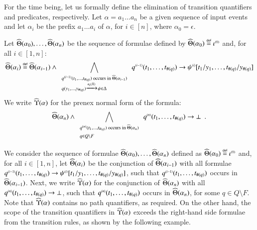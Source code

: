 For the time being, let us formally define the elimination of
transition quantifiers and predicates, respectively. Let $\alpha = a_1
\ldots a_n$ be a given sequence of input events and let
$\alpha_i$ be the prefix $a_1 \ldots a_i$ of $\alpha$, for $i \in [n]$,
where $\alpha_0=\epsilon$.
\ifLongVersion
\begin{definition}\label{def:quantform}
  Let $\widehat{\Theta}({\alpha_0}), \ldots, \widehat{\Theta}({\alpha_n})$ be the
  sequence of formulae defined by $\widehat{\Theta}({\alpha_0}) \stackrel{\scriptscriptstyle{\mathsf{def}}}{=}
  {\iota}^{\scriptscriptstyle{({0})}}$ and, for all $i \in [1,n]$:
  \[\widehat{\Theta}({\alpha_i}) \stackrel{\scriptscriptstyle{\mathsf{def}}}{=} \widehat{\Theta}({\alpha_{i-1}}) \wedge
  \bigwedge_{\begin{array}{l}
      \scriptstyle{{q}^{\scriptscriptstyle{({i-1})}}(t_1,\ldots,t_{\#(q)}) \text{ occurs in } \widehat{\Theta}({\alpha_{i-1}})} \\
      \scriptstyle{q(y_1,\ldots,y_{\#(q)}) \xrightarrow{{\scriptscriptstyle a_i(X)}}_{{\scriptstyle }} \psi \in \Delta} 
  \end{array}} {q}^{\scriptscriptstyle{({i-1})}}(t_1,\ldots,t_{\#(q)}) \rightarrow 
    {\psi}^{\scriptscriptstyle{({i})}}[t_1/y_1, \ldots, t_{\#(q)}/y_{\#(q)}]
      \]  
      We write
    $\widehat{\Upsilon}({\alpha})$ for the prenex normal form of the formula: 
      \[\widehat{\Theta}({\alpha_n}) \wedge \bigwedge_{\begin{array}{l}
          \scriptstyle{{q}^{\scriptscriptstyle{({n})}}(t_1,\ldots,t_{\#(q)}) \text{ occurs in } \widehat{\Theta}({\alpha_n})} \\
          \scriptstyle{q \in Q \setminus F}
      \end{array}} {q}^{\scriptscriptstyle{({n})}}(t_1,\ldots,t_{\#(q)}) \rightarrow \bot \enspace.\]
\end{definition}
\else
We consider the sequence of formulae $\widehat{\Theta}({\alpha_0}), \ldots,
\widehat{\Theta}({\alpha_n})$ defined as $\widehat{\Theta}({\alpha_0}) \stackrel{\scriptscriptstyle{\mathsf{def}}}{=}
{\iota}^{\scriptscriptstyle{({0})}}$ and, for all $i \in [1,n]$, let
$\widehat{\Theta}({\alpha_i})$ be the conjunction of
$\widehat{\Theta}({\alpha_{i-1}})$ with all formulae
${q}^{\scriptscriptstyle{({i-1})}}(t_1,\ldots,t_{\#(q)}) \rightarrow
{\psi}^{\scriptscriptstyle{({i})}}[t_1/y_1, \ldots, t_{\#(q)}/y_{\#(q)}]$, such that
${q}^{\scriptscriptstyle{({i-1})}}(t_1,\ldots,t_{\#(q)})$ occurs in
$\widehat{\Theta}({\alpha_{i-1}})$. Next, we write $\widehat{\Upsilon}({\alpha})$ for
the conjunction of $\widehat{\Theta}({\alpha_n})$ with all
${q}^{\scriptscriptstyle{({n})}}(t_1,\ldots,t_{\#(q)}) \rightarrow \bot$, such that
${q}^{\scriptscriptstyle{({n})}}(t_1,\ldots,t_{\#(q)})$ occurs in
$\widehat{\Theta}({\alpha_n})$, for some $q \in Q \setminus F$.
\fi
Note that $\widehat{\Upsilon}({\alpha})$ contains no path quantifiers, as
required. On the other hand, the scope of the transition quantifiers
in $\widehat{\Upsilon}({\alpha})$ exceeds the right-hand side formulae from the
transition rules, as shown by the following example.

